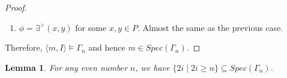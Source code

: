 \documentclass[12pt, reqno]{amsart}
\newtheorem{lemma}[theorem]{Lemma}
\theoremstyle{definition}
\theoremstyle{remark}
\numberwithin{equation}{section}
\begin{document}
\begin{proof}
\begin{enumerate}
		  If $x, y \in P_0$. This is clear as there is no change to the interpretation. 
		  
		 If $x, y \in P_1$. The new interpretation function adds the same elements to the interpretation of both variables so there is no change regarding the order of their cardinality. 
		 
		 If $x \in P_0$ and $y \in P_1$ This is impossible as we put $P_{0} = \{S \subseteq n \mid |S| < \frac{n}{2}\}$.
		 
		  If $x \in P_1$ and $y \in P_0$. This still holds since the new elements are added only to the interpretation of $x$, not to that of $y$. 
  		 \item $\phi = \exists^{>}(x, y)$ for some $x, y \in P$.
		 Almost the same as the previous case. 
 	\end{enumerate}
	
	Therefore, $\langle m, I\rangle \models \Gamma_n$ and hence $m \in Spec(\Gamma_n)$. 
\end{proof}


\begin{lemma}\label{e_indiscernible}
	For any even number $n$, we have $\{2i \mid 2i \geq n \} \subseteq Spec(\Gamma_n)$.
\end{lemma}
\end{document}

